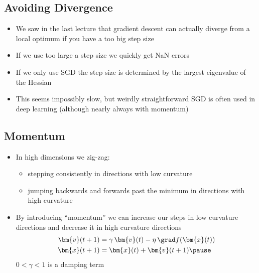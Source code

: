 \begin{slide}
\section{Avoiding Divergence}

\begin{PauseHighLight}
  \begin{itemize}
  \item We saw in the last lecture that gradient descent can actually
    diverge from a local optimum if you have a too big step size\pause
  \item If we use too large a step size we quickly get NaN
    errors\pause
  \item If we only use SGD the step size is determined by the largest
    eigenvalue of the Hessian\pause
  \item This seems impossibly slow\pauseb, but weirdly straightforward
    SGD is often used in deep learning\pauseb{} (although nearly always with momentum)\pauseb
  \end{itemize}
\end{PauseHighLight}

\end{slide}


\begin{slide}
  \section{Momentum}

  \begin{PauseHighLight}
    \begin{itemize}
    \item In high dimensions we zig-zag:
      \begin{itemize}
      \item stepping consistently in directions with low curvature
      \item jumping backwards and forwards past the minimum in
        directions with high curvature\pause
      \end{itemize}
    \item By introducing ``momentum'' we can increase our steps in
      low curvature directions and decrease it in high curvature
      directions
      \begin{align*}
        \bm{v}(t+1) &= \gamma \, \bm{v}(t) -  \eta\, \grad f(\bm{x}(t))\\
        \bm{x}(t+1) &= \bm{x}(t) + \bm{v}(t+1)\pause
      \end{align*}
      $0<\gamma<1$ is a damping term\pauseb 
    \end{itemize}
  \end{PauseHighLight}


\end{slide}


